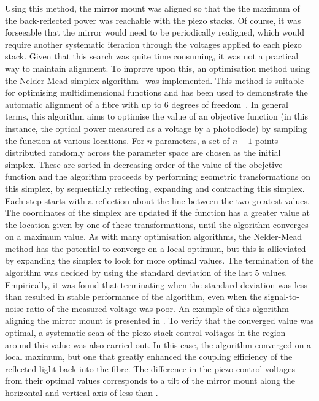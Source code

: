 Using this method, the mirror mount was aligned so that the the maximum of the back-reflected power was reachable with the piezo stacks. Of course, it was forseeable that the mirror would need to be periodically realigned, which would require another systematic iteration through the voltages applied to each piezo stack. Given that this search was quite time consuming, it was not a practical way to maintain alignment. To improve upon this, an optimisation method using the Nelder-Mead simplex algorithm~\cite{Nelder1965} was implemented. This method is suitable for optimising multidimensional functions and has been used to demonstrate the automatic alignment of a fibre with up to 6 degrees of freedom~\cite{Zhang2004}.  In general terms, this algorithm aims to optimise the value of an objective function (in this instance, the optical power measured as a voltage by a photodiode) by sampling the function at various locations. For \(n\) parameters, a set of \(n-1\) points distributed randomly across the parameter space are chosen as the initial simplex. These are sorted in decreasing order of the value of the obejctive function and the algorithm proceeds by performing geometric transformations on this simplex, by sequentially reflecting, expanding and contracting this simplex. Each step starts with a reflection about the line between the two greatest values. The coordinates of the simplex are updated if the function has a greater value at the location given by one of these transformations, until the algorithm converges on a maximum value. As with many optimisation algorithms, the Nelder-Mead method has the potential to converge on a local optimum, but this is allieviated by expanding the simplex to look for more optimal values. The termination of the algorithm was decided by using the standard deviation of the last 5 values. Empirically, it was found that terminating when the standard deviation was less than  resulted in stable performance of the algorithm, even when the signal-to-noise ratio of the measured voltage was poor. An example of this algorithm aligning the mirror mount is presented in . To verify that the converged value was optimal, a systematic scan of the piezo stack control voltages in the region around this value was also carried out. In this case, the algorithm converged on a local maximum, but one that greatly enhanced the coupling efficiency of the reflected light back into the fibre. The difference in the piezo control voltages from their optimal values corresponds to a tilt of the mirror mount along the horizontal and vertical axis of less than .
